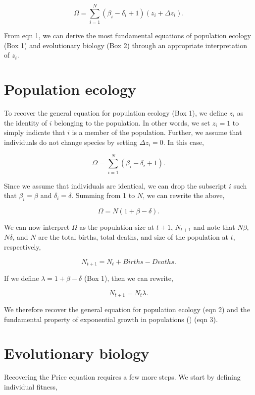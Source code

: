\documentclass[
]{article}
\begin{document}
\[\Omega = \sum_{i=1}^{N} \left(\beta_{i} - \delta_{i} + 1 \right)\left(z_{i} + \Delta z_{i} \right).
\tag{1}
\]

From eqn 1, we can derive the most fundamental equations of population
ecology (Box 1) and evolutionary biology (Box 2) through an appropriate
interpretation of \(z_{i}\).

\section{Population ecology}\label{population-ecology}

To recover the general equation for population ecology (Box 1), we
define \(z_{i}\) as the identity of \(i\) belonging to the population.
In other words, we set \(z_{i} = 1\) to simply indicate that \(i\) is a
member of the population. Further, we assume that individuals do not
change species by setting \(\Delta z_{i} = 0\). In this case,

\[\Omega = \sum_{i=1}^{N} \left(\beta_{i} - \delta_{i} + 1 \right).\]

Since we assume that individuals are identical, we can drop the
subscript \(i\) such that \(\beta_{i} = \beta\) and
\(\delta_{i} = \delta\). Summing from 1 to \(N\), we can rewrite the
above,

\[\Omega = N\left(1 + \beta - \delta \right).\]

We can now interpret \(\Omega\) as the population size at \(t+1\),
\(N_{t+1}\) and note that \(N\beta\), \(N\delta\), and \(N\) are the
total births, total deaths, and size of the population at \(t\),
respectively,

\[N_{t+1} = N_{t} + Births - Deaths.
\tag{2}
\]

If we define \(\lambda = 1 + \beta - \delta\) (Box 1), then we can
rewrite,

\[N_{t+1} = N_{t}\lambda.
\tag{3}
\]

We therefore recover the general equation for population ecology (eqn 2)
and the fundamental property of exponential growth in populations
() (eqn 3).

\section{Evolutionary biology}\label{evolutionary-biology}

Recovering the Price equation requires a few more steps. We start by
defining individual fitness,
\end{document}
